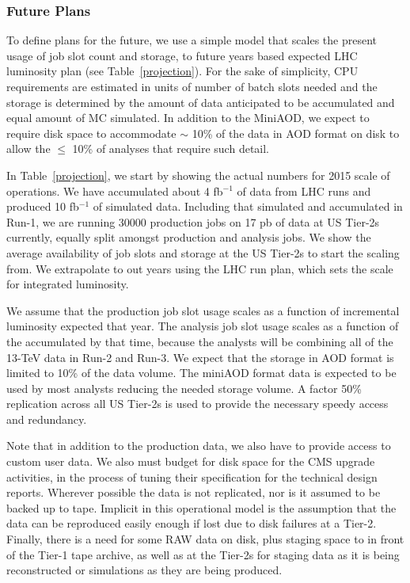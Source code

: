 \documentclass[11pt,a4paper]{article}
\begin{document}
\subsubsection{Future Plans}


To define plans for the future, we use a simple model that scales
the present usage of job slot count and storage, to future years based
expected LHC  luminosity plan (see Table~\ref{projection}).
For the sake of simplicity, CPU requirements are estimated in units of number of 
batch slots needed and the storage is determined by the amount of
data anticipated to be accumulated and equal amount of MC simulated.
In addition to the MiniAOD, we expect to require disk space to accommodate 
$\sim$ 10\% of the data in AOD format on disk to allow the $\le$ 10\% of 
analyses that require such detail.

In Table~\ref{projection}, we start by showing the actual numbers for
2015 scale of operations.  We have accumulated about 4 fb$^{-1}$
of data from LHC runs and produced 10 fb$^{-1}$ of simulated data.
Including that simulated and accumulated in Run-1, we are running
30000 production jobs on 17 pb of data at US Tier-2s currently,
equally split amongst production and analysis jobs.  We show the
average availability of job slots and storage at the US Tier-2s to
start the scaling from.  We extrapolate to out years using the
LHC run plan, which sets the scale for integrated luminosity.

We assume that the production job slot usage scales as a function of 
incremental luminosity expected that year.  The analysis job slot usage
scales as a function of the accumulated by that time, because the analysts
will be combining all of the 13-TeV data in Run-2 and Run-3.
We expect that the storage in AOD format is limited to 10\% of
the data volume.  The miniAOD format data is expected to be
used by most analysts reducing the needed storage volume.  A
factor 50\% replication across all US Tier-2s is used to provide 
the necessary speedy access and redundancy.

Note that in addition to the production data, we also have to provide
access to custom user data.  We also must budget for disk space for 
the CMS upgrade activities, in the process of tuning their specification
for the technical design reports.  Wherever possible the data is not replicated, 
nor is it assumed to be  backed up to tape. Implicit in this operational model 
is the assumption that the data can be reproduced easily enough if lost due 
to disk failures at a Tier-2.  Finally, there is a need for some RAW data on disk, 
plus staging space to in front of the Tier-1 tape archive, as well as at the Tier-2s
for staging data as it is being reconstructed or simulations as they are being 
produced. 
\end{document}
